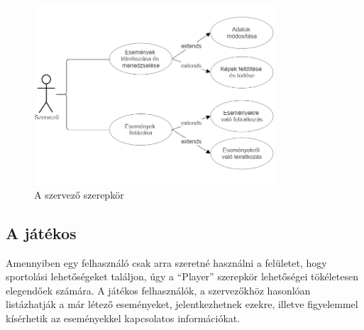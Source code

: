  \begin{figure}[ht]
    \centering
    \includegraphics[width=0.8\textwidth]{./images/Screenshot 2024-04-13 021859.png}
    \caption{A szervező szerepkör}
    \label{fig:organizer_role}
  \end{figure}

  \subsection{A játékos}

  Amennyiben egy felhasználó csak arra szeretné használni a felületet, hogy sportolási lehetőségeket találjon, úgy a ``Player'' szerepkör
  lehetőségei tökéletesen elegendőek számára. A játékos felhasználók, a szervezőkhöz hasonlóan listázhatják a már létező eseményeket, 
  jelentkezhetnek ezekre, illetve figyelemmel kísérhetik az eseményekkel kapcsolatos információkat.